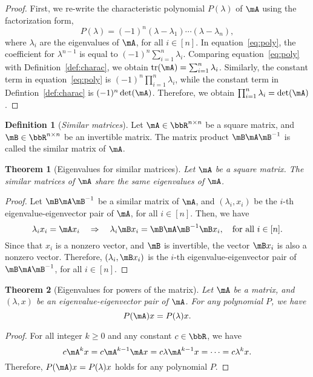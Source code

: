 \documentclass[11pt]{article}
\DeclareMathOperator{\tr}{tr}
\theoremstyle{plain}
\newtheorem{thm}{Theorem}[section]
\theoremstyle{definition}
\newtheorem{defn}{Definition}
\begin{document}
\begin{proof}
	First, we re-write the characteristic polynomial $P(\lambda)$ of $\mA$ using the factorization form,
	\begin{equation}\label{eq:poly}
		P(\lambda) = (-1)^n (\lambda - \lambda_1)\cdots (\lambda - \lambda_n), 
	\end{equation}   
	where $\lambda_i$ are the eigenvalues of $\mA$, for all $ i \in [n]$. In equation~\eqref{eq:poly}, the coefficient for $\lambda^{n-1}$ is equal to $(-1)^n\sum_{i=1}^n \lambda_i$. Comparing equation~\eqref{eq:poly} with Definition~\ref{def:charac}, we obtain $\tr(\mA) = \sum_{i=1}^n \lambda_i$. Similarly, the constant term in equation~\eqref{eq:poly} is $(-1)^n \prod_{i=1}^n \lambda_i $, while the constant term in Defintion~\ref{def:charac} is $(-1)^n \det(\mA)$.  Therefore, we obtain $\prod_{i=1}^n \lambda_i = \det(\mA)$.
\end{proof}

\begin{defn}[\textit{Similar matrices}]\label{def:similar}
	Let $\mA \in \bbR^{n \times n}$ be a square matrix, and $\mB \in \bbR^{n \times n}$ be an invertible matrix. The matrix product $\mB \mA \mB^{-1}$ is called the similar matrix of $\mA$.
\end{defn}

\begin{thm}[Eigenvalues for similar matrices]\label{thm:similar}
	Let $\mA$ be a square matrix. The similar matrices of $\mA$ share the same eigenvalues of $\mA$.
\end{thm}
\begin{proof}
	Let $\mB \mA \mB^{-1}$ be a similar matrix of $\mA$, and $(\lambda_i, x_i)$ be the $i$-th eigenvalue-eigenvector pair of $\mA$, for all $i \in [n]$. Then, we have
	\[ \lambda_i x_i = \mA x_i \quad \Rightarrow \quad \lambda_i \mB x_i = \mB \mA \mB^{-1} \mB x_i, \quad \text{for all }i \in [n]. \]
	Since that $x_i$ is a nonzero vector, and $\mB$ is invertible, the vector $\mB x_i$ is also a nonzero vector. Therefore, $(\lambda_i, \mB x_i)$ is the $i$-th eigenvalue-eigenvector pair of $\mB \mA \mB^{-1}$, for all $i \in [n]$.
\end{proof}

\begin{thm}[Eigenvalues for powers of the matrix]
	Let $\mA$ be a matrix, and $(\lambda,x)$  be an eigenvalue-eigenvector pair of $\mA$. For any polynomial $P$, we have
	\[ P(\mA) x = P(\lambda) x. \]
\end{thm}
\begin{proof}
	For all integer $k \geq 0$ and any constant $c \in \bbR$, we have
	\[ c\mA^k x = c\mA^{k-1} \mA x= c\lambda \mA^{k-1} x = \cdots = c\lambda^k x.\]
	Therefore, $P(\mA)x = P(\lambda)x$ holds for any polynomial $P$.
\end{proof}
\end{document}
